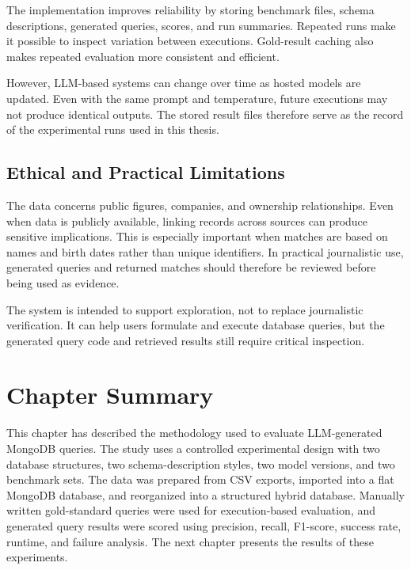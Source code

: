 The implementation improves reliability by storing benchmark files, schema descriptions, generated queries, scores, and run summaries. Repeated runs make it possible to inspect variation between executions. Gold-result caching also makes repeated evaluation more consistent and efficient.

However, LLM-based systems can change over time as hosted models are updated. Even with the same prompt and temperature, future executions may not produce identical outputs. The stored result files therefore serve as the record of the experimental runs used in this thesis.

\subsection{Ethical and Practical Limitations}

The data concerns public figures, companies, and ownership relationships. Even when data is publicly available, linking records across sources can produce sensitive implications. This is especially important when matches are based on names and birth dates rather than unique identifiers. In practical journalistic use, generated queries and returned matches should therefore be reviewed before being used as evidence.

The system is intended to support exploration, not to replace journalistic verification. It can help users formulate and execute database queries, but the generated query code and retrieved results still require critical inspection.

\section{Chapter Summary}

This chapter has described the methodology used to evaluate LLM-generated MongoDB queries. The study uses a controlled experimental design with two database structures, two schema-description styles, two model versions, and two benchmark sets. The data was prepared from CSV exports, imported into a flat MongoDB database, and reorganized into a structured hybrid database. Manually written gold-standard queries were used for execution-based evaluation, and generated query results were scored using precision, recall, F1-score, success rate, runtime, and failure analysis. The next chapter presents the results of these experiments.

